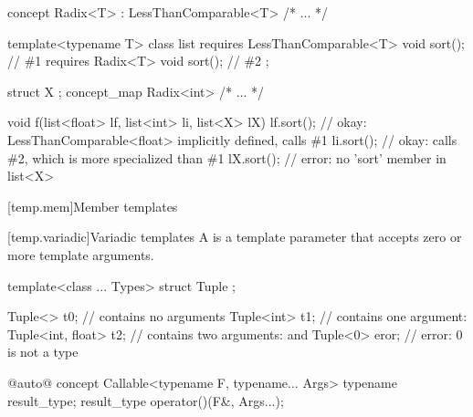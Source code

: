 \documentclass[american]{book}
\begin{document}
\begin{paras}
\begin{codeblock}
concept Radix<T> : LessThanComparable<T> { /* ... */ }

template<typename T>
class list {
  requires LessThanComparable<T> void sort(); // \#1
  requires Radix<T> void sort(); // \#2
};

struct X { };
concept_map Radix<int> { /* ... */ }

void f(list<float> lf, list<int> li, list<X> lX) 
{
  lf.sort(); // okay: LessThanComparable<float> implicitly defined, calls \#1
  li.sort(); // okay: calls \#2, which is more specialized than \#1
  lX.sort(); // error: no 'sort' member in list<X>
}
\end{codeblock}
\addedConcepts{\mbox{\exitexample}}
\color{black}

[temp.mem]{Member templates}

\setcounter{Paras}{9}
\pnum
{}

[temp.variadic]{Variadic templates}
\pnum
A \mbox{} is a template parameter
that accepts zero or more template arguments. \mbox{\enterexample}

\begin{codeblock}
template<class ... Types> struct Tuple { };

Tuple<> t0;             //  contains no arguments
Tuple<int> t1;          //  contains one argument: 
Tuple<int, float> t2;   //  contains two arguments:  and 
Tuple<0> eror;          // error: 0 is not a type
\end{codeblock}

\mbox{\exitexample}

 \color{addclr}
\begin{codeblock}
@\textcolor{addclr}{auto}@ concept Callable<typename F, typename... Args> {
  typename result_type;
  result_type operator()(F&, Args...);
}
\end{codeblock}
\color{black}\addedConcepts{\mbox{\exitexample\ \exitnote}}


\end{paras}
\end{document}
